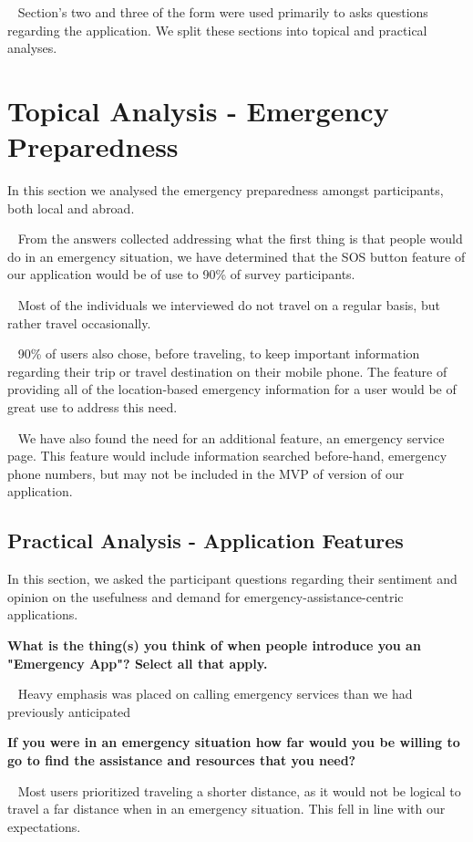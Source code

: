 \documentclass{scrreprt}
\begin{document}
\par ~ Section's two and three of the form were used primarily to asks questions regarding the application. We split these sections into topical and practical analyses.

\section{Topical Analysis - Emergency Preparedness}
In this section we analysed the emergency preparedness amongst participants, both local and abroad.

\par ~ From the answers collected addressing what the first thing is that people would do in an emergency situation, we have determined that the SOS button feature of our application would be of use to 90\% of survey participants.

\par ~ Most of the individuals we interviewed do not travel on a regular basis, but rather travel occasionally. 

\par ~ 90\% of users also chose, before traveling, to keep important information regarding their trip or travel destination on their mobile phone. The feature of providing all of the location-based emergency information for a user would be of great use to address this need.

\par ~ We have also found the need for an additional feature, an emergency service page. This feature would include information searched before-hand, emergency phone numbers, but may not be included in the MVP of version of our application.

\subsection{Practical Analysis - Application Features}
In this section, we asked the participant questions regarding their sentiment and opinion on the usefulness and demand for emergency-assistance-centric applications.

\textbf{What is the thing(s) you think of when people introduce you an "Emergency App"? Select all that apply.}
\par ~ Heavy emphasis was placed on calling emergency services than we had previously anticipated

\textbf{If you were in an emergency situation how far would you be willing to go to find the assistance and resources that you need?}
\par ~ Most users prioritized traveling a shorter distance, as it would not be logical to travel a far distance when in an emergency situation. This fell in line with our expectations.
\end{document}
